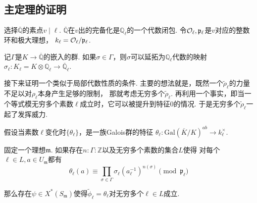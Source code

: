 \subsection{主定理的证明}

选择$\overline{\mathbb{Q}}$的素点$v\mid \ell$.
$\overline{\mathbb{Q}}$在$v$出的完备化是$\mathbb{Q}_{\ell}$的一个代数闭包.
令$\mathcal{O}_{\ell}, \mathfrak{p}_{\ell}$是$v$对应的整数环和极大理想，
$k_{\ell} = \mathcal{O}_{\ell} / \mathfrak{p}_{\ell}$.

记$\Gamma$是$K\to \overline{\mathbb{Q}}$的嵌入的群.
如果$\sigma\in \Gamma$，则$\sigma$可以延拓为$\mathbb{Q}_{\ell}$代数的映射
$\sigma_{\ell}: K_{\ell} = K\otimes \mathbb{Q}_{\ell}\to \overline{\mathbb{Q}}_{\ell}$.

接下来证明一个类似于局部代数性质的条件.
主要的想法就是，既然一个$\tilde{\rho}_{\ell}$的力量不足以对$\rho_{\ell}$本身产生足够的限制，
那就考虑无穷多个$\tilde{\rho}_{\ell}$.
再利用一个事实，即当一个等式模无穷多个素数$\ell$成立时，它可以被提升到特征$0$的情况.
于是无穷多个$\tilde{\rho}_{\ell}$一起了发挥威力.

假设当素数$\ell$变化时$\{\theta_{\ell}\}$，是一族Galois群的特征
$\theta_{\ell}: \mathrm{Gal}(\overline{K}/K)^{ab}\to k_{\ell}^{\times}$.

\begin{cprop}
    固定一个理想$\mathfrak{m}$.
    如果存在$n:\Gamma: \mathbb{Z}$以及无穷多个素数的集合$L$使得
    对每个$\ell\in L, a\in U_{\mathfrak{m}}$都有
    \begin{equation}
        \theta_{\ell}(a) \equiv \prod_{\sigma\in \Gamma} \sigma_{\ell}(a_{\ell}^{-1})^{n(\sigma)} \pmod{\mathfrak{p}_{\ell}}
    \end{equation}

    那么存在$\psi\in X^{*}(S_{\mathfrak{m}})$使得$\tilde{\phi}_{\ell} = \theta_{\ell}$对无穷多个$\ell\in L$成立.
\end{cprop}

